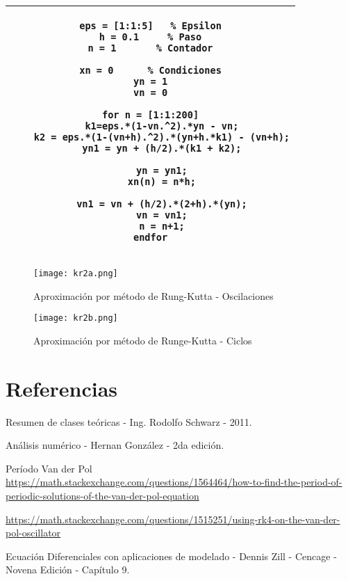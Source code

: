 \documentclass[a4paper, 10pt, spanish]{article}
\begin{document}
\begin{center}
\begin{tabular}{c}
\\
\hline
\begin{lstlisting}
eps = [1:1:5] 	% Epsilon
h = 0.1		% Paso
n = 1 		% Contador

xn = 0 		% Condiciones
yn = 1
vn = 0

for n = [1:1:200]
	k1=eps.*(1-vn.^2).*yn - vn;
	k2 = eps.*(1-(vn+h).^2).*(yn+h.*k1) - (vn+h);
	yn1 = yn + (h/2).*(k1 + k2);
	
	yn = yn1;
	xn(n) = n*h;

	vn1 = vn + (h/2).*(2+h).*(yn);
	vn = vn1;
	n = n+1;
endfor
\end{lstlisting}
\\
\hline
\end{tabular}
\end{center}

\newpage

\begin{figure}[H]
\centering
\texttt{[image: kr2a.png]}
\caption{Aproximación por método de Rung-Kutta - Oscilaciones}
\end{figure}

\begin{figure}[H]
\centering
\texttt{[image: kr2b.png]}
\caption{Aproximación por método de Runge-Kutta - Ciclos}
\end{figure}


\newpage
\section{Referencias}
\begin{enumerate}[{[}1{]}]
  \item Resumen de clases teóricas - Ing. Rodolfo Schwarz - 2011.
  \item Análisis numérico - Hernan González - 2da edición.
  \item Período Van der Pol \\\small\url{https://math.stackexchange.com/questions/1564464/how-to-find-the-period-of-periodic-solutions-of-the-van-der-pol-equation}
  \item \url{https://math.stackexchange.com/questions/1515251/using-rk4-on-the-van-der-pol-oscillator}
  \item Ecuación Diferenciales con aplicaciones de modelado - Dennis Zill - Cencage - Novena Edición - Capítulo 9.
\end{enumerate}
\end{document}
